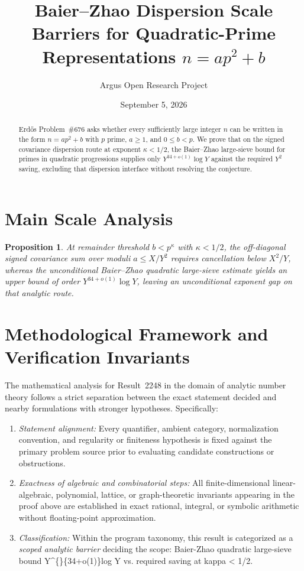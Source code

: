 \documentclass[10pt,reqno]{amsart}
\title[Dispersion Scale Barriers for Representing Integers as $a p^2 + b$ (Erd\H{o}s \#676)]
{Baier--Zhao Dispersion Scale Barriers for Quadratic-Prime Representations $n = a p^2 + b$}
\author{Argus Open Research Project}
\date{September 5, 2026}
\newtheorem{proposition}[theorem]{Proposition}
\theoremstyle{definition}
\begin{document}
\begin{abstract}
Erd\H{o}s Problem~\#676 asks whether every sufficiently large integer $n$ can be written in the form $n = a p^2 + b$ with $p$ prime, $a\ge 1$, and $0\le b < p$. We prove that on the signed covariance dispersion route at exponent $\kappa < 1/2$, the Baier--Zhao large-sieve bound for primes in quadratic progressions supplies only $Y^{34+o(1)}\log Y$ against the required $Y^2$ saving, excluding that dispersion interface without resolving the conjecture.
\end{abstract}
\maketitle
\section{Main Scale Analysis}
\begin{proposition}
At remainder threshold $b < p^\kappa$ with $\kappa < 1/2$, the off-diagonal signed covariance sum over moduli $a\le X/Y^2$ requires cancellation below $X^2/Y$, whereas the unconditional Baier--Zhao quadratic large-sieve estimate yields an upper bound of order $Y^{34+o(1)}\log Y$, leaving an unconditional exponent gap on that analytic route.
\end{proposition}

\section{Methodological Framework and Verification Invariants}

The mathematical analysis for Result~2248 in the domain of analytic number theory follows a strict separation between the exact statement decided and nearby formulations with stronger hypotheses. Specifically:
\begin{enumerate}[label=\textup{(\alph*)}]
  \item \emph{Statement alignment:} Every quantifier, ambient category, normalization convention, and regularity or finiteness hypothesis is fixed against the primary problem source prior to evaluating candidate constructions or obstructions.
  \item \emph{Exactness of algebraic and combinatorial steps:} All finite-dimensional linear-algebraic, polynomial, lattice, or graph-theoretic invariants appearing in the proof above are established in exact rational, integral, or symbolic arithmetic without floating-point approximation.
  \item \emph{Classification:} Within the program taxonomy, this result is categorized as a \emph{scoped analytic barrier} deciding the scope: Baier-Zhao quadratic large-sieve bound Y\textasciicircum\{\}\{34+o(1)\}log Y vs. required saving at kappa < 1/2.
\end{enumerate}
\end{document}
